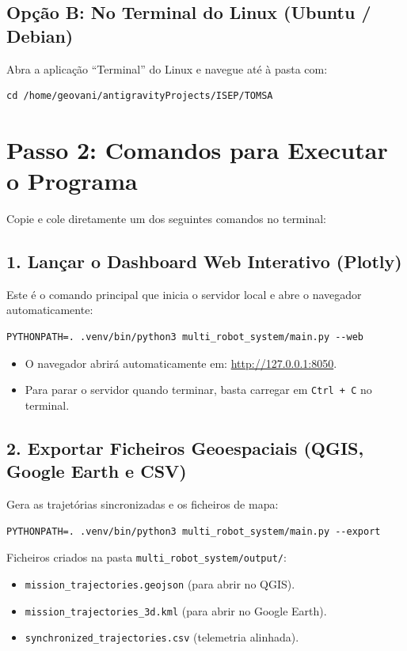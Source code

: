 \documentclass[11pt,a4paper]{article}
\begin{document}
\subsection{Opção B: No Terminal do Linux (Ubuntu / Debian)}
Abra a aplicação ``Terminal'' do Linux e navegue até à pasta com:
\begin{lstlisting}
cd /home/geovani/antigravityProjects/ISEP/TOMSA
\end{lstlisting}

\section{Passo 2: Comandos para Executar o Programa}

Copie e cole diretamente um dos seguintes comandos no terminal:

\subsection{1. Lançar o Dashboard Web Interativo (Plotly)}
Este é o comando principal que inicia o servidor local e abre o navegador automaticamente:
\begin{lstlisting}
PYTHONPATH=. .venv/bin/python3 multi_robot_system/main.py --web
\end{lstlisting}
\begin{itemize}[nosep]
    \item O navegador abrirá automaticamente em: \url{http://127.0.0.1:8050}.
    \item Para parar o servidor quando terminar, basta carregar em \texttt{Ctrl + C} no terminal.
\end{itemize}

\subsection{2. Exportar Ficheiros Geoespaciais (QGIS, Google Earth e CSV)}
Gera as trajetórias sincronizadas e os ficheiros de mapa:
\begin{lstlisting}
PYTHONPATH=. .venv/bin/python3 multi_robot_system/main.py --export
\end{lstlisting}
Ficheiros criados na pasta \texttt{multi\_robot\_system/output/}:
\begin{itemize}[nosep]
    \item \texttt{mission\_trajectories.geojson} (para abrir no QGIS).
    \item \texttt{mission\_trajectories\_3d.kml} (para abrir no Google Earth).
    \item \texttt{synchronized\_trajectories.csv} (telemetria alinhada).
\end{itemize}
\end{document}
